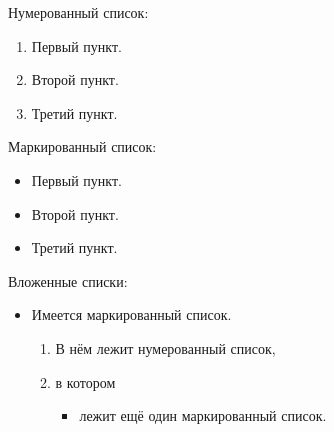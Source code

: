 \noindent Нумерованный список:
\begin{enumerate}
    \item Первый пункт.
    \item Второй пункт.
    \item Третий пункт.
\end{enumerate}

\noindent Маркированный список:
\begin{itemize}
    \item Первый пункт.
    \item Второй пункт.
    \item Третий пункт.
\end{itemize}

\noindent Вложенные списки:
\begin{itemize}
    \item Имеется маркированный список.
          \begin{enumerate}
              \item В нём лежит нумерованный список,
              \item в котором
                    \begin{itemize}
                        \item лежит ещё один маркированный список.
                    \end{itemize}
          \end{enumerate}
\end{itemize}

